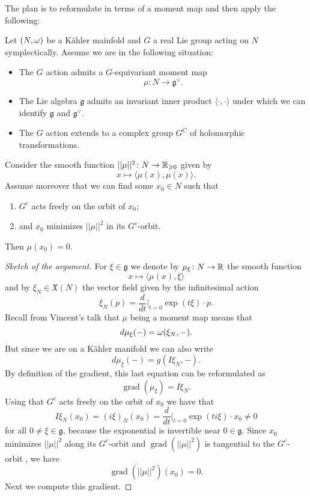 \documentclass[A4paper, 12pt, british, reqno]{amsart}
\DeclareMathOperator{\grad}{grad}
\newcommand{\dual}{^{\vee}}
\renewcommand{\X}{\mathfrak{X}}
\newcommand{\g}{\mathfrak{g}}
\newcommand{\1}{\mathbbm{1}}
\begin{document}
The plan is to reformulate  in terms of a moment map and then apply the following:

\begin{metalm}\label{metalm}
    Let $(N,\omega)$ be a Kähler mainfold and $G$ a real Lie group acting on $N$ symplectically.
    Assume we are in the following situation:
    \begin{itemize}
	\item The $G$ action admits a $G$-equivariant moment map
	    \[ \mu\colon N\to \g\dual. \]
	\item The Lie algebra $\g$ admits an invariant inner product $\langle \cdot,\cdot \rangle$ under which we can identify $\g$ and $\g\dual$.
	\item The $G$ action extends to a complex group $G^{C}$ of holomorphic transformations.
    \end{itemize}
    Consider the smooth function $||\mu||^{2}\colon N\to \mathbb{R}_{\geqslant 0}$ given by
    \[ x\mapsto \langle \mu(x),\mu(x)\rangle. \]
    Assume moreover that we can find some $x_{0}\in N$ such that
    \begin{enumerate}[label=\alph*)]
	\item $G^{c}$ acts freely on the orbit of $x_{0}$;
	\item and $x_{0}$ minimizes $||\mu||^{2}$ in its $G^{c}$-orbit.
    \end{enumerate}
    Then $\mu(x_{0})=0$.
    \begin{proof}[Sketch of the argument]
	For $\xi\in \g$ we denote by $\mu_{\xi}\colon N\to \mathbb{R}$ the smooth function
	\[ x\mapsto \langle \mu(x),\xi \rangle \]
	and by $\xi_{N}\in \X(N)$ the vector field given by the infinitesimal action
	\[ \xi_{N}(p)=\frac{d}{dt}\big\rvert_{t=0}\exp(t\xi)\cdot p. \]
	Recall from Vincent's talk that $\mu$ being a moment map means that
	\[ d\mu_{\xi}(-)=\omega(\xi_{N},-). \]
	But since we are on a Kähler manifold \cite[\S 3]{voi02} we can also write
	\[ d\mu_{\xi}(-)=g(I\xi_{N},-). \]
	By definition of the gradient, this last equation can be reformulated as
	\[ \grad(\mu_{\xi})=I\xi_{N}. \]
	Using that $G^{c}$ acts freely on the orbit of $x_{0}$ we have that
	\[ I\xi_{N}(x_{0})=(i\xi)_{N}(x_{0})=\frac{d}{dt}\big\rvert_{t=0}\exp(ti\xi)\cdot x_{0}\neq 0 \]
	for all $0\neq \xi\in \g$, because the exponential is invertible near $0\in \g$.
	Since $x_{0}$ minimizes $||\mu||^{2}$ along its $G^{c}$-orbit and $\grad(||\mu||^{2})$ is tangential to the $G^{c}$-orbit \cite[(8.12)]{ab83}, we have
	\[ \grad(||\mu||^{2})(x_{0})=0. \]
	Next we compute this gradient.

\end{proof}
\end{metalm}
\end{document}
